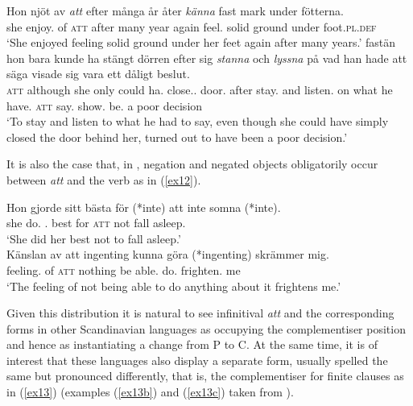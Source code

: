 \documentclass[output=paper]{langsci/langscibook}
\begin{document}
\begin{exe}
\ex\label{ex11} 
\begin{xlist}
\ex
\gll Hon nj\"ot av {\itshape  att} efter m\aa nga	\aa r \aa ter {\itshape  k\"anna} fast mark under f\"otterna.\\
she enjoy.\Pst{} of \textsc{att} after many year again feel.\Inf{} solid ground under foot.\textsc{pl.def}\\\trans
\enquote*{She enjoyed feeling solid ground under her feet again after many years.}
\ex{} fast\"an hon bara kunde ha st\"angt d\"orren efter sig {\itshape  stanna}	och {\itshape  lyssna} {p\aa} vad han hade att s\"aga visade sig vara ett d\aa ligt beslut.\\	\textsc{att}	although she only could ha.\Inf{} close.\Pst.\Ptcp{} door.\Def{} after \Refl{} stay.\Inf{} and listen.\Inf{} on  what he have.\Pst{} \textsc{att} say.\Inf{} show.\Pst{} \Refl{} be.\Inf{} a poor decision\\\trans \enquote*{To stay and listen to what he had to say, even though she could have simply closed the door behind her, turned out to have been a poor decision.}
\end{xlist}
\end{exe}

It is also the case that, in , negation and negated objects
obligatorily occur between \emph{att} and the verb as in (\ref{ex12}).

\begin{exe}
\ex\label{ex12} 
\begin{xlist}
\ex
\gll Hon gjorde sitt b\"asta f\"or (*inte) att inte somna (*inte).\\
she do.\Pst{} \Refl.\Poss{} best for {} \textsc{att} not {fall asleep.\Inf{}} {}\\
\trans \enquote*{She did her best not to fall asleep.}\\
\ex
\gll K\"anslan av att ingenting kunna g\"ora (*ingenting) skr\"ammer mig.\\
feeling.\Def{} of \textsc{att} nothing {be able.\Inf{}} do.\Inf{} {} frighten.\Prs{} me\\
\trans \enquote*{The feeling of not being able to do anything about it frightens me.}
\end{xlist}
\end{exe}

Given this distribution it is natural to see  infinitival
\emph{att} and the corresponding forms in other Scandinavian languages as
occupying the complementiser position and hence as instantiating a change from
P to C. At the same time, it is of interest that these languages also display a
separate form, usually spelled the same but pronounced differently, that is,
the complementiser for finite clauses as in (\ref{ex13})
(examples (\ref{ex13b}) and (\ref{ex13c}) taken from \citealt{NordBoye16}).
\end{document}
